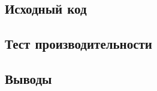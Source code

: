 \documentclass[12pt]{article}
\begin{document}
\subsection*{Исходный код}%

\subsection*{Тест производительности}%

\subsection*{Выводы}%
\end{document}
